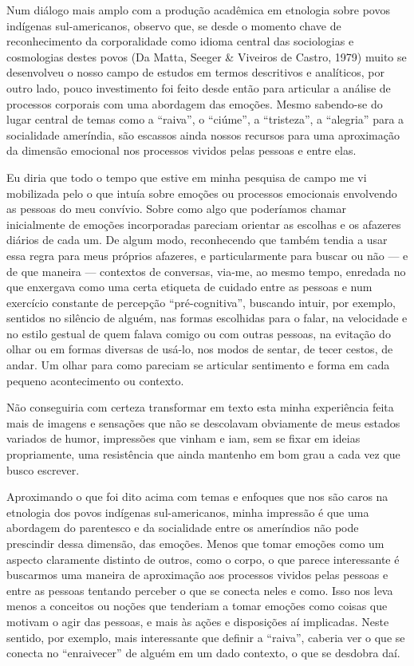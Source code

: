 Num diálogo mais amplo com a produção acadêmica em etnologia sobre povos
indígenas sul-americanos, observo que, se desde o momento chave de
reconhecimento  da corporalidade como idioma central das sociologias e
cosmologias destes povos (Da Matta, Seeger \& Viveiros de Castro,
1979) muito se desenvolveu o nosso campo de estudos em termos
descritivos e analíticos, por outro lado, pouco investimento foi feito
desde então para articular a análise de processos corporais com uma
abordagem das emoções. Mesmo sabendo-se do lugar central de temas como
a ``raiva'', o ``ciúme'', a ``tristeza'', a ``alegria'' para a socialidade
ameríndia, são escassos ainda nossos recursos para uma aproximação da
dimensão emocional nos processos vividos pelas pessoas e entre elas.

Eu diria que todo o tempo que estive em minha pesquisa de campo me vi
mobilizada pelo o que intuía sobre emoções ou processos emocionais
envolvendo as pessoas do meu convívio. Sobre como algo que poderíamos
chamar inicialmente de emoções incorporadas pareciam orientar as
escolhas e os afazeres diários de cada um. De algum modo, reconhecendo
que também tendia a usar essa regra para meus próprios afazeres, e
particularmente para buscar ou não — e de que maneira — contextos de
conversas, via-me, ao mesmo tempo, enredada no que enxergava como uma
certa etiqueta de cuidado entre as pessoas e num exercício constante de
percepção ``pré-cognitiva'', buscando intuir, por exemplo, sentidos no
silêncio de alguém, nas formas escolhidas para o falar, na velocidade e
no estilo gestual de quem falava comigo ou com outras pessoas, na
evitação do olhar ou em formas diversas de usá-lo, nos modos de sentar,
de tecer cestos, de andar. Um olhar para como pareciam se articular
sentimento e forma em cada pequeno acontecimento ou contexto.

Não conseguiria com certeza transformar em texto esta minha experiência
feita mais de imagens e sensações que não se descolavam obviamente de
meus estados variados de humor, impressões que vinham e iam, sem se
fixar em ideias propriamente, uma resistência que ainda mantenho em bom
grau a cada vez que busco escrever.

Aproximando o que foi dito acima com temas e enfoques que nos são caros
na etnologia dos povos indígenas sul-americanos, minha impressão é que
uma abordagem do parentesco e da socialidade entre os ameríndios não
pode prescindir dessa dimensão, das emoções. Menos que tomar emoções
como um aspecto claramente distinto de outros, como o corpo, o que
parece interessante é buscarmos uma maneira de aproximação aos
processos vividos pelas pessoas e entre as pessoas tentando perceber o
que se conecta neles e como. Isso nos leva menos a conceitos ou noções
que tenderiam a tomar emoções como coisas que motivam o agir das
pessoas, e mais às ações e disposições aí implicadas. Neste sentido,
por exemplo, mais interessante que definir a ``raiva'', caberia ver o que
se conecta no ``enraivecer'' de alguém em um dado contexto, o que se
desdobra daí.

